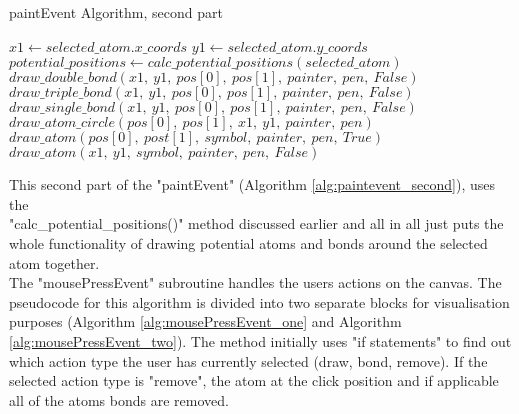 \documentclass[a4paper,12pt]{article}
\begin{document}
\begin{algorithm}
\footnotesize
\caption{paintEvent Algorithm, second part}\label{alg:paintevent_second}
\begin{algorithmic}
	\State $ x1\gets selected\_atom.x\_coords$
	\State $ y1\gets selected\_atom.y\_coords$
		\State $ potential\_positions\gets calc\_potential\_positions(selected\_atom)$
					\State $ draw\_double\_bond(x1,\ y1,\ pos[0],\ pos[1],\ painter,\ pen,\ False)$
					\State $ draw\_triple\_bond(x1,\ y1,\ pos[0],\ pos[1],\ painter,\ pen,\ False)$
				\Else
					\State $ draw\_single\_bond(x1,\ y1,\ pos[0],\ pos[1],\ painter,\ pen,\ False)$
				\EndIf
				\State $ draw\_atom\_circle(pos[0],\ pos[1],\ x1,\ y1,\  painter,\ pen)$
				\State $ draw\_atom(pos[0],\ post[1],\ symbol,\ painter,\ pen,\ True)$
				\State $ draw\_atom(x1,\ y1,\ symbol,\ painter,\ pen,\ False)$
			\EndIf
		\EndFor
	\EndIf
	\EndIf
\EndIf
\end{algorithmic}
\end{algorithm}

This second part of the "paintEvent" (Algorithm \ref{alg:paintevent_second}), uses the\\
"calc\_potential\_positions()" method discussed earlier and all in all just puts the whole functionality of drawing potential atoms and bonds around the selected atom together.\\

The "mousePressEvent" subroutine handles the users actions on the canvas. The pseudocode for this algorithm is divided into two separate blocks for visualisation purposes (Algorithm \ref{alg:mousePressEvent_one} and Algorithm \ref{alg:mousePressEvent_two}). The method initially uses "if statements" to find out which action type the user has currently selected (draw, bond, remove). If the selected action type is "remove", the atom at the click position and if applicable all of the atoms bonds are removed.\\

\newpage
\end{document}

